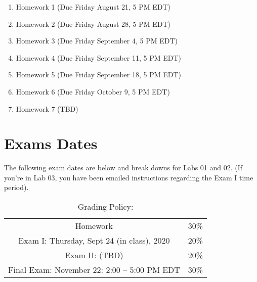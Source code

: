 \documentclass[11pt]{article}
\begin{document}
\begin{enumerate}
\item Homework 1 (Due Friday August 21, 5 PM EDT)
\item Homework 2 (Due Friday August 28, 5 PM EDT)
\item Homework 3 (Due Friday September 4, 5 PM EDT)
\item Homework 4 (Due Friday September 11, 5 PM EDT)
\item Homework 5 (Due Friday September 18, 5 PM EDT)
\item Homework 6 (Due Friday October 9, 5 PM EDT)
\item Homework 7 (TBD)
\end{enumerate} 


\section{Exams Dates} 
The following exam dates are below and break downs for Labs 01 and 02. (If you're in Lab 03, you have been emailed instructions regarding the Exam I time period). 

\begin{table}[h!]
\caption{Grading Policy:}
\begin{center}
\begin{tabular}{cc}
Homework &30\%\\
Exam I:  Thursday, Sept 24 (in class), 2020 &20\%\\
Exam  II: (TBD) & 20\%\\
Final Exam:  November 22: 2:00 -- 5:00 PM EDT & 30\%\\
\end{tabular}
\end{center}
\label{default}
\end{table}%
\end{document}
